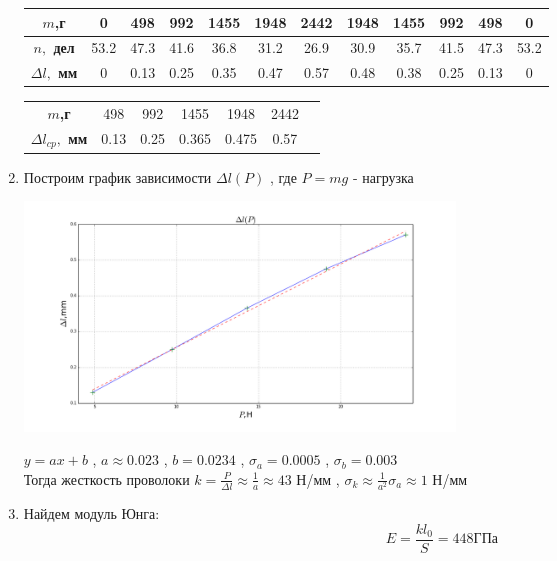 \documentclass[8pt]{article}
\begin{document}
\begin{enumerate}
    \begin{center}
    \begin{tabular}{|c|c|c|c|c|c|c|c|c|c|c|c|}
        \hline
        \textbf{$m$,г} & 0 & 498 & 992 & 1455 & 1948 & 2442 & 1948 & 1455 & 992 & 498 & 0 \\
        \hline
        \textbf{$n,$ дел} & 53.2 & 47.3 & 41.6 & 36.8 & 31.2 & 26.9 & 30.9 & 35.7 & 41.5 & 47.3 & 53.2 \\
        \hline
        \textbf{$\Delta l,$ мм} & 0 & 0.13 & 0.25 & 0.35 & 0.47 & 0.57 & 0.48 & 0.38 & 0.25 & 0.13 & 0\\
        \hline
    \end{tabular}
    \end{center}

    \begin{center}
    \begin{tabular}{|c|c|c|c|c|c|c|}
        \hline
        \textbf{$m$,г} & 498 & 992 & 1455 & 1948 & 2442\\
        \textbf{$\Delta l_{cp},$ мм} & 0.13 &  0.25  & 0.365 & 0.475 & 0.57 \\
        \hline
    \end{tabular}
    \end{center}

    \item Построим график зависимости $\Delta l(P)$ , где $P = mg$ - нагрузка
    
    \begin{center} 
        \includegraphics[width=4.5in]{graph.png} 
    \end{center}

    $y = ax + b$ , $a \approx 0.023$ , $b = 0.0234$ , $\sigma_a = 0.0005$ , $\sigma_b = 0.003$\\
    Тогда жесткость проволоки $k = \frac{P}{\Delta l} \approx \frac{1}{a} \approx 43 $ Н/мм , 
    $\sigma_k \approx \frac{1}{a^2} \sigma_a \approx 1$ Н/мм
    \item
    Найдем модуль Юнга:
    \begin{equation}
        E = \frac{kl_0}{S} = 448 \text{ГПа} 
    \end{equation}


\end{enumerate}
\end{document}
